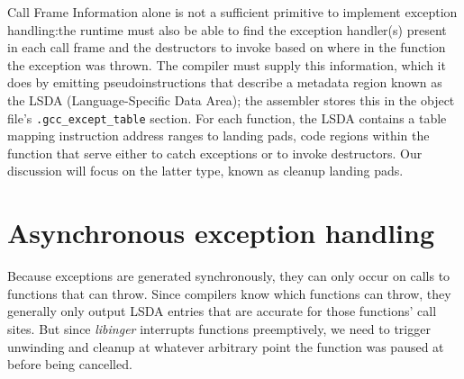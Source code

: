 Call Frame Information alone is not a sufficient primitive to implement exception
handling:\@ the runtime must also be able to find the exception handler(s) present in
each call frame and the destructors to invoke based on where in the function the
exception was thrown.  The compiler must supply this information, which it does by
emitting pseudoinstructions that describe a metadata region known as the LSDA
(Language-Specific Data Area); the assembler stores this in the object file's
\texttt{.gcc\_except\_table} section.  For each function, the LSDA contains a table
mapping instruction address ranges to landing pads, code regions within the function
that serve either to catch exceptions or to invoke destructors.  Our discussion will
focus on the latter type, known as cleanup landing pads.


\section{Asynchronous exception handling}
\label{sec:ingerc:async}

Because exceptions are generated synchronously, they can only occur on calls to
functions that can throw.  Since compilers know which functions can throw, they
generally only output LSDA entries that are accurate for those functions' call sites.
But since \textit{libinger} interrupts functions preemptively, we need to trigger
unwinding and cleanup at whatever arbitrary point the function was paused at before
being cancelled.

